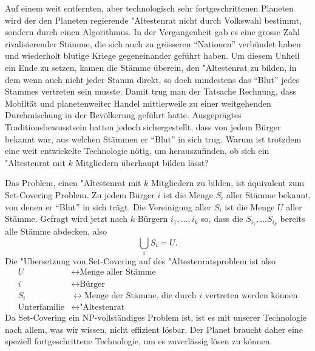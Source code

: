 Auf einem weit entfernten, aber technologisch sehr fortgeschrittenen
Planeten wird der den Planeten regierende "Altestenrat
nicht durch Volkswahl bestimmt, sondern durch einen Algorithmus.
In der Vergangenheit gab es eine grosse Zahl rivalisierender
Stämme, die sich auch zu grösseren ``Nationen'' verbündet haben
und wiederholt blutige Kriege gegeneinander geführt haben.
Um diesem Unheil ein Ende zu setzen, kamen die Stämme überein,
den "Altestenrat zu bilden, in dem wenn auch nicht jeder Stamm direkt,
so doch mindestens das ``Blut'' jedes Stammes vertreten sein musste.
Damit trug man der Tatsache Rechnung, dass Mobiltät und planetenweiter
Handel mittlerweile zu einer weitgehenden Durchmischung in der
Bevölkerung geführt hatte. Ausgeprägtes Traditionsbewusstsein hatten
jedoch sichergestellt, dass von jedem Bürger bekannt war, aus welchen
Stämmen er ``Blut'' in sich trug. Warum ist trotzdem eine weit entwickelte
Technologie nötig, um herauszufinden, ob sich ein "Altestenrat
mit $k$ Mitgliedern überhaupt bilden lässt?


\begin{loesung}
Das Problem, einen "Altestenrat mit $k$  Mitgliedern zu bilden, ist
äquivalent zum Set-Covering Problem. Zu jedem Bürger $i$
ist die Menge $S_i$ aller Stämme bekannt, von denen er ``Blut''
in sich trägt. Die Vereinigung aller $S_i$ ist die Menge $U$ aller
Stämme. Gefragt wird jetzt nach $k$ Bürgern $i_1,\dots,i_k$ so,
dass die $S_{i_1},\dots S_{i_k}$ bereits alle Stämme abdecken, also
\[
\bigcup_i S_i=U.
\]
Die "Ubersetzung von Set-Covering auf des "Altestenratsproblem ist also
\begin{align*}
U&\leftrightarrow\text{Menge aller Stämme}\\
i&\leftrightarrow\text{Bürger}\\
S_i&\leftrightarrow\text{Menge der Stämme, die durch $i$ vertreten werden können}\\
\text{Unterfamilie}&\leftrightarrow\text{"Altestenrat}
\end{align*}
Da Set-Covering ein NP-vollständiges Problem ist, ist es mit unserer
Technologie nach allem, was wir wissen, nicht effizient lösbar. Der
Planet braucht daher eine speziell fortgeschrittene Technologie, um es
zuverlässig lösen zu können.
\end{loesung}
